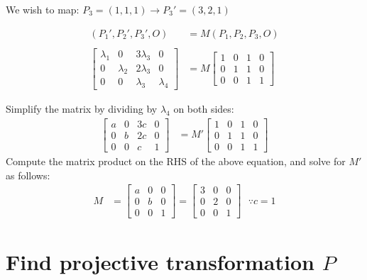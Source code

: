 \documentclass[12pt, oneside]{article}
\begin{document}
We wish to map: $P_3 = (1, 1, 1) \to {P_3}' = (3, 2, 1)$

\begin{align*}
({P_1}', {P_2}', {P_3}', O) &= M ({P_1}, {P_2}, {P_3}, O) \\ \\
\begin{bmatrix}
\lambda_1 	& 0 		& 3\lambda_3 	& 0 \\
0 			& \lambda_2 & 2\lambda_3 	& 0 \\
0		 	& 0 		& \lambda_3 	& \lambda_4 
\end{bmatrix}  &=
M \begin{bmatrix}
1 			& 0 	& 1 	& 0 \\
0 			& 1 	& 1 	& 0 \\
0		 	& 0 	& 1 	& 1 
\end{bmatrix} 
\end{align*}

Simplify the matrix by dividing by $\lambda_4$ on both sides:
\begin{align*}
\begin{bmatrix}
a 	& 0 & 3c 	& 0 \\
0 	& b & 2c 	& 0 \\
0	& 0 & c 	& 1
\end{bmatrix}  &=
M' \begin{bmatrix}
1 			& 0 	& 1 	& 0 \\
0 			& 1 	& 1 	& 0 \\
0		 	& 0 	& 1 	& 1 
\end{bmatrix} 
\end{align*}
Compute the matrix product on the RHS of the above equation, and solve for $M'$ as follows:
\begin{align*}
M  &=
 \begin{bmatrix}
a 			& 0 	& 0 	\\
0 			& b 	& 0 	\\
0		 	& 0 	& 1 	
\end{bmatrix}  =
 \begin{bmatrix}
3 			& 0 	& 0 	\\
0 			& 2 	& 0 	\\
0		 	& 0 	& 1 	
\end{bmatrix}  \text{ $\because c = 1$}
\end{align*}

\section{Find projective transformation $P$}  
\end{document}
